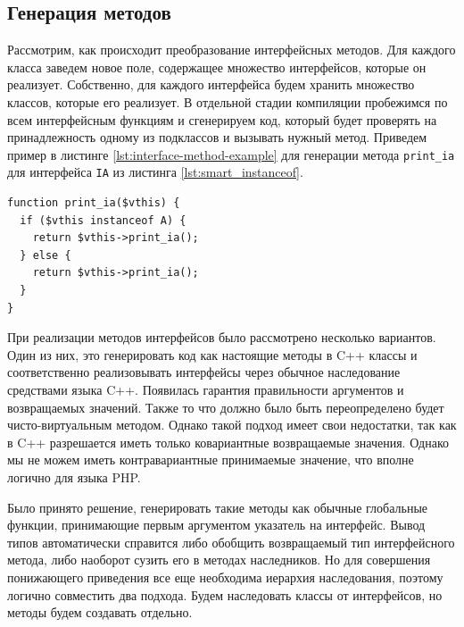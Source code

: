 \subsection{Генерация методов}
Рассмотрим, как происходит преобразование интерфейсных методов.
Для каждого класса заведем новое поле, содержащее множество интерфейсов, которые он реализует.
Собственно, для каждого интерфейса будем хранить множество классов, которые его реализует.
В отдельной стадии компиляции пробежимся по всем интерфейсным функциям и сгенерируем код, который будет проверять на принадлежность одному из подклассов и вызывать нужный метод.
Приведем пример в листинге \ref{lst:interface-method-example} для генерации метода \verb|print_ia| для интерфейса \verb|IA| из листинга \ref{lst:smart_instanceof}.
\begin{lstlisting}[caption={Пример генерации интерфейсного метода},label={lst:interface-method-example}]
function print_ia($vthis) {
  if ($vthis instanceof A) {
    return $vthis->print_ia();
  } else {
    return $vthis->print_ia();
  }
}
\end{lstlisting}

При реализации методов интерфейсов было рассмотрено несколько вариантов.
Один из них, это генерировать код как настоящие методы в C++ классы и соответственно реализовывать интерфейсы через обычное наследование средствами языка C++.
Появилась гарантия правильности аргументов и возвращаемых значений.
Также то что должно было быть переопределено будет чисто-виртуальным методом.
Однако такой подход имеет свои недостатки, так как в C++ разрешается иметь только ковариантные возвращаемые значения.
Однако мы не можем иметь контравариантные принимаемые значение, что вполне логично для языка PHP.

Было принято решение, генерировать такие методы как обычные глобальные функции, принимающие первым аргументом указатель на интерфейс.
Вывод типов автоматически справится либо обобщить возвращаемый тип интерфейсного метода, либо наоборот сузить его в методах наследников.
Но для совершения понижающего приведения все еще необходима иерархия наследования, поэтому логично совместить два подхода.
Будем наследовать классы от интерфейсов, но методы будем создавать отдельно.

